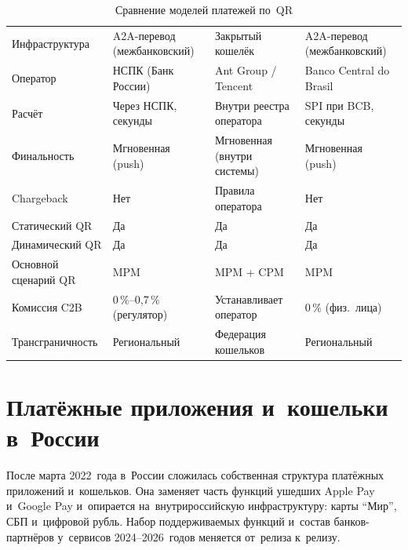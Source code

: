 \begin{table}[htbp]
  \caption{Сравнение моделей платежей по~QR}\label{tab:qr-three-models}
  \begingroup
  \tablesetup
  \setlength{\tabcolsep}{3pt}
  \begin{minipage}{\textwidth}
    \begin{tabularx}{\textwidth}{
        @{}B{0.19\textwidth}
        P{0.245\textwidth}
        P{0.245\textwidth}
        P{0.245\textwidth}@{}
      }
      \toprule
      \headrow
      \thd{\thd{}}
      &  &  &  \\
      \midrule
      Инфраструктура & A2A-перевод (межбанковский) & Закрытый кошелёк & A2A-перевод (межбанковский) \\
      \rowsep
      Оператор & НСПК (Банк России) & Ant Group / Tencent & Banco Central do Brasil \\
      \rowsep
      Расчёт & Через НСПК, секунды & Внутри реестра оператора & SPI при BCB, секунды \\
      \rowsep
      Финальность & Мгновенная (push) & Мгновенная (внутри системы) & Мгновенная (push) \\
      \rowsep
      Chargeback & Нет & Правила оператора & Нет \\
      \rowsep
      Статический QR & Да & Да & Да \\
      \rowsep
      Динамический QR & Да & Да & Да \\
      \rowsep
      Основной сценарий QR & MPM & MPM + CPM & MPM \\
      \rowsep
      Комиссия C2B & 0\,\%--0{,}7\,\% (регулятор) & Устанавливает оператор & 0\,\% (физ.\ лица) \\
      \rowsep
      Трансграничность & Региональный & Федерация кошельков & Региональный \\
      \bottomrule
    \end{tabularx}
  \end{minipage}\par
  \endgroup
\end{table}

\section{Платёжные приложения и~кошельки в~России}\label{sec:russia-wallets}

После марта 2022~года в~России сложилась собственная структура платёжных
приложений и~кошельков. Она заменяет часть функций ушедших Apple Pay и~Google
Pay и~опирается на~внутрироссийскую инфраструктуру: карты \enquote{Мир}, СБП
и~цифровой рубль. Набор поддерживаемых функций и~состав
банков-партнёров у~сервисов 2024--2026~годов меняется от~релиза к~релизу.


